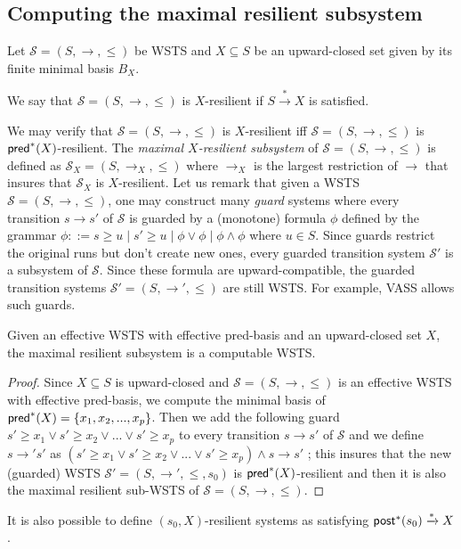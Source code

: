 \subsection{Computing the maximal resilient subsystem}

Let $\mathscr{S}=(S, \rightarrow, \leq)$ be WSTS and $X \subseteq S$ be an upward-closed set given by its finite minimal basis $B_X$. 

\begin{definition}
We say that $\mathscr{S}=(S, \rightarrow, \leq)$ is $X$-resilient if $S  \xrightarrow{*} X$ is satisfied.  
\end{definition}

We may verify that  $\mathscr{S}=(S, \rightarrow, \leq)$ is $X$-resilient iff  $\mathscr{S}=(S, \rightarrow, \leq)$ is $\textsf{pred}^*(X)$-resilient. The \emph{maximal $X$-resilient subsystem} of $\mathscr{S}=(S,\rightarrow,\leq)$ is defined as $\mathscr{S}_X=(S,\rightarrow_X,\leq)$ where $\rightarrow_X$ is the largest restriction of $\rightarrow$ that insures that $\mathscr{S}_X$ is $X$-resilient.
Let us remark that given a WSTS $\mathscr{S}=(S, \rightarrow, \leq)$, one may construct many \emph{guard} systems where every transition $s \rightarrow s'$ of $\mathscr{S}$ is guarded by a (monotone) formula $\phi$ defined by the grammar $\phi ::= s \geq u \mid s' \geq u \mid \phi \vee \phi \mid \phi \wedge \phi$ where $u \in S$. Since guards restrict the original runs but don't create new ones, every guarded transition system $\mathscr{S'}$ is a subsystem of $\mathscr{S}$. Since these formula are upward-compatible, the guarded transition systems $\mathscr{S'}=(S, \rightarrow', \leq)$ are still WSTS.
%
For example, VASS allows such guards.

\begin{theorem}{}
Given an effective WSTS with effective pred-basis and an upward-closed set $X$, the maximal resilient subsystem is a computable WSTS.
\end{theorem}

\begin{proof}
Since $X \subseteq S$ is upward-closed and $\mathscr{S}=(S, \rightarrow, \leq)$ is an effective WSTS with effective pred-basis, we compute the minimal basis of $\textsf{pred}^*(X)=\{x_1,x_2,...,x_p\}$. 
%
%
Then we add the following guard $s' \geq x_1  	\vee s' \geq x_2  	\vee...	\vee s' \geq x_p$ to every transition $s \rightarrow s'$ of $\mathscr{S}$ and we define  $s \rightarrow' s'$ as $(s' \geq x_1  	\vee s' \geq x_2  	\vee...	\vee s' \geq x_p) \wedge s \rightarrow s'$ ; this insures that the new (guarded) WSTS $\mathscr{S'}=(S, \rightarrow', \leq,s_0)$ is $\textsf{pred}^*(X)$-resilient and then it is also the maximal resilient sub-WSTS of $\mathscr{S}=(S, \rightarrow, \leq)$.
		\end{proof}
%
It is also possible to define $(s_0,X)$-resilient systems as satisfying $\textsf{post}^*(s_0) \xrightarrow{*} X$.



